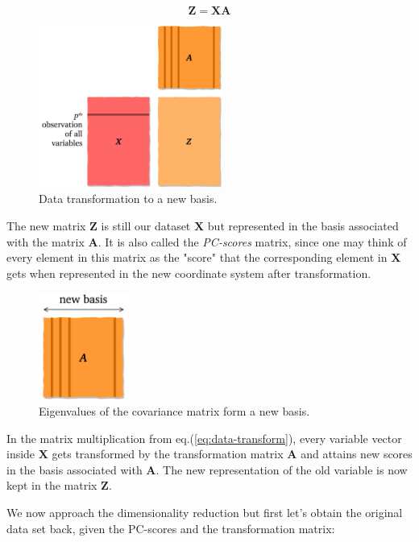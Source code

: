 \documentclass[10pt,twocolumn]{article}
\begin{document}
\begin{equation} \label{eq:data-transform}
\bm{Z} = \bm{X} \bm{A}
\end{equation}

\begin{figure}[H]
\centering\includegraphics[width=6cm]{data-transformation.png}
\caption{Data transformation to a new basis.}
\label{fig:data-transformation}
\end{figure}

The new matrix $\bm{Z}$ is still our dataset $\bm{X}$ but represented in the basis associated with the matrix $\bm{A}$. It is also called the \textit{PC-scores} matrix, since one may think of every element in this matrix as the "score" that the corresponding element in $\bm{X}$ gets when represented in the new coordinate system after transformation.

\begin{figure}
\centering\includegraphics[width=3cm]{new-basis.png}
\caption{Eigenvalues of the covariance matrix form a new basis.}
\label{fig:new-basis}
\end{figure}


In the matrix multiplication from eq.(\ref{eq:data-transform}), every variable vector inside $\bm{X}$ gets transformed by the transformation matrix $\bm{A}$ and attains new scores in the basis associated with $\bm{A}$. The new representation of the old variable is now kept in the matrix $\bm{Z}$.

We now approach the dimensionality reduction but first let's obtain the original data set back, given the PC-scores and the transformation matrix:
\end{document}
